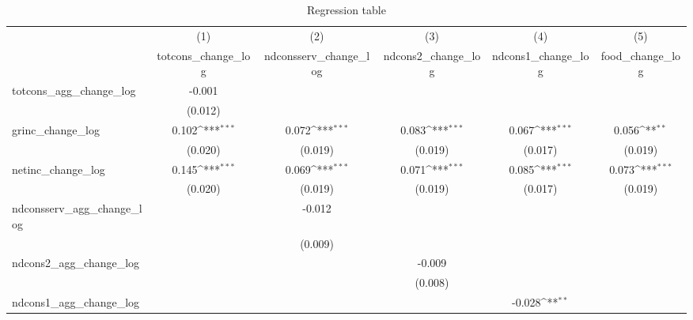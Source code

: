 \begin{table}[htbp]\centering
\def\sym#1{\ifmmode^{#1}\else\(^{#1}\)\fi}
\caption{Regression table\label{tab1}}
\begin{tabular}{l*{5}{c}}
\hline\hline
                    &\multicolumn{1}{c}{(1)}&\multicolumn{1}{c}{(2)}&\multicolumn{1}{c}{(3)}&\multicolumn{1}{c}{(4)}&\multicolumn{1}{c}{(5)}\\
                    &\multicolumn{1}{c}{totcons\_change\_log}&\multicolumn{1}{c}{ndconsserv\_change\_log}&\multicolumn{1}{c}{ndcons2\_change\_log}&\multicolumn{1}{c}{ndcons1\_change\_log}&\multicolumn{1}{c}{food\_change\_log}\\
\hline
totcons\_agg\_change\_log&      -0.001         &                     &                     &                     &                     \\
                    &     (0.012)         &                     &                     &                     &                     \\
grinc\_change\_log    &       0.102\sym{***}&       0.072\sym{***}&       0.083\sym{***}&       0.067\sym{***}&       0.056\sym{**} \\
                    &     (0.020)         &     (0.019)         &     (0.019)         &     (0.017)         &     (0.019)         \\
netinc\_change\_log   &       0.145\sym{***}&       0.069\sym{***}&       0.071\sym{***}&       0.085\sym{***}&       0.073\sym{***}\\
                    &     (0.020)         &     (0.019)         &     (0.019)         &     (0.017)         &     (0.019)         \\
ndconsserv\_agg\_change\_log&                     &      -0.012         &                     &                     &                     \\
                    &                     &     (0.009)         &                     &                     &                     \\
ndcons2\_agg\_change\_log&                     &                     &      -0.009         &                     &                     \\
                    &                     &                     &     (0.008)         &                     &                     \\
ndcons1\_agg\_change\_log&                     &                     &                     &      -0.028\sym{**} &                     \\

\end{tabular}
\end{table}
